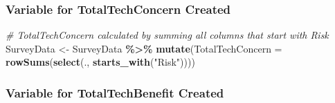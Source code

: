 \documentclass[
]{article}
\newenvironment{Shaded}{\begin{snugshade}}{\end{snugshade}}
\newcommand{\AttributeTok}[1]{\textcolor[rgb]{0.13,0.29,0.53}{#1}}
\newcommand{\CommentTok}[1]{\textcolor[rgb]{0.56,0.35,0.01}{\textit{#1}}}
\newcommand{\ConstantTok}[1]{\textcolor[rgb]{0.56,0.35,0.01}{#1}}
\newcommand{\DecValTok}[1]{\textcolor[rgb]{0.00,0.00,0.81}{#1}}
\newcommand{\FunctionTok}[1]{\textcolor[rgb]{0.13,0.29,0.53}{\textbf{#1}}}
\newcommand{\NormalTok}[1]{#1}
\newcommand{\OtherTok}[1]{\textcolor[rgb]{0.56,0.35,0.01}{#1}}
\newcommand{\SpecialCharTok}[1]{\textcolor[rgb]{0.81,0.36,0.00}{\textbf{#1}}}
\newcommand{\StringTok}[1]{\textcolor[rgb]{0.31,0.60,0.02}{#1}}
\begin{document}
\begin{Shaded}
\end{Shaded}

\hypertarget{variable-for-totaltechconcern-created}{%
\subsubsection{Variable for TotalTechConcern
Created}\label{variable-for-totaltechconcern-created}}

\begin{Shaded}
\begin{Highlighting}[]
\CommentTok{\# TotalTechConcern calculated by summing all columns that start with \textquotesingle{}Risk\textquotesingle{}}
\NormalTok{SurveyData }\OtherTok{\textless{}{-}}\NormalTok{ SurveyData }\SpecialCharTok{\%\textgreater{}\%}
  \FunctionTok{mutate}\NormalTok{(}\AttributeTok{TotalTechConcern =} \FunctionTok{rowSums}\NormalTok{(}\FunctionTok{select}\NormalTok{(., }\FunctionTok{starts\_with}\NormalTok{(}\StringTok{"Risk"}\NormalTok{))))}
\end{Highlighting}
\end{Shaded}

\hypertarget{variable-for-totaltechbenefit-created}{%
\subsubsection{Variable for TotalTechBenefit
Created}\label{variable-for-totaltechbenefit-created}}
\end{document}
